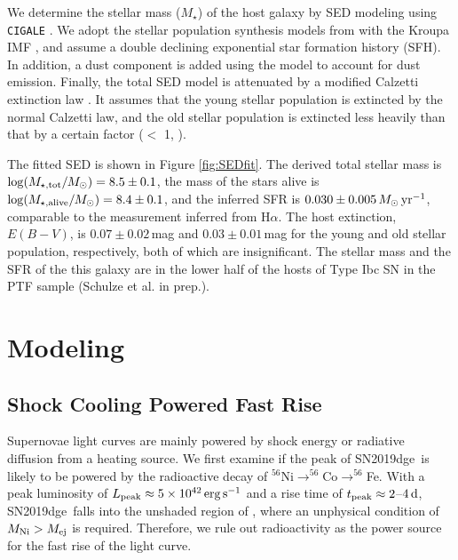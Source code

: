 \documentclass[twocolumn]{aastex63}
\newcommand{\name}{SN2019dge}
\begin{document}
\begin{CJK*}{UTF8}{gbsn}
We determine the stellar mass ($M_{\star}$) of the host galaxy by SED modeling using 
\texttt{CIGALE} \citep{CIGALE19}. We adopt the stellar population synthesis models from \citet{BC03} 
with the Kroupa IMF \citep{Kroupa01}, and assume a double declining  exponential star formation 
history (SFH). In addition, a dust component is added using the \citet{DL07} model to account for dust 
emission. Finally, the total SED model is attenuated by a modified Calzetti extinction law 
\citep{Calzetti2000}. It assumes that the young stellar population is extincted by the normal Calzetti 
law, and the old stellar population is extincted less heavily than that by a certain factor ($<$ 1, 
\citealt{Charlot2000}). 

The fitted SED is shown in Figure 
\ref{fig:SEDfit}. The derived total stellar mass is ${\rm log}(M_{\star, \rm tot}/M_{\odot}) = 8.5 \pm 0.1$, 
the mass of the stars alive is ${\rm log}(M_{\star, \rm alive}/M_{\odot}) = 8.4 \pm 0.1$, and the 
inferred SFR is $0.030 \pm 0.005\, M_\odot\, {\rm yr^{-1}}$, comparable to the measurement inferred 
from H$\alpha$. The host extinction, $E(B - V)$, is $0.07 \pm 
0.02$\,mag and $0.03 \pm 0.01$\,mag for the young and old stellar population, respectively, 
both of which are insignificant. The stellar mass and the SFR of the this galaxy are in the lower half of 
the hosts of Type Ibc SN in the PTF sample (Schulze et al. in prep.). 


\section{Modeling} \label{sec:modelling}
\subsection{Shock Cooling Powered Fast Rise} \label{subsec:fastrise}
Supernovae light curves are mainly powered by shock energy or radiative diffusion from a heating 
source. We first examine if the peak of \name\ is likely to be powered by the radioactive decay of 
$^{56}$Ni$\rightarrow ^{56}$Co$\rightarrow ^{56}$Fe. With a peak luminosity of $L_{\rm 
peak}\approx 5\times 10^{42}\,{\rm erg \, s^{-1}}$ and a rise time of  $t_{\rm peak}\approx 2$--$4\,{\rm 
d}$, \name\ falls into the unshaded region of \citet[][their Figure~1]{Kasen2017}, where an unphysical 
condition of $M_{\rm Ni} > M_{\rm ej}$ is required. Therefore, we rule out radioactivity as the 
power source for the fast rise of the light curve.


\end{CJK*}
\end{document}
